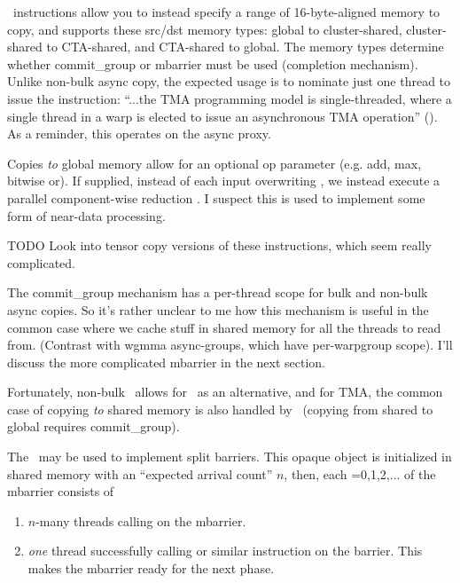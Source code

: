 \filbreak
{} \cpAsyncBulk\ instructions allow you to instead specify a range of 16-byte-aligned memory to copy, and supports these src/dst memory types: global to cluster-shared, cluster-shared to CTA-shared, and CTA-shared to global. The memory types determine whether commit\_group or mbarrier must be used (completion mechanism). Unlike non-bulk async copy, the expected usage is to nominate just one thread to issue the instruction: ``...the TMA programming model is single-threaded, where a single thread in a warp is elected to issue an asynchronous TMA operation'' (\hopperBlog). As a reminder, this operates on the async proxy.

\filbreak
Copies \textit{to} global memory allow for an optional  op parameter (e.g. add, max, bitwise or).
If supplied, instead of each input  overwriting , we instead execute a parallel component-wise reduction .
I suspect this is used to implement some form of near-data processing.

\filbreak
TODO Look into tensor copy versions of these instructions, which seem really complicated.


\filbreak
{} The commit\_group mechanism has a per-thread scope for bulk and non-bulk async copies. So it's rather unclear to me how this mechanism is useful in the common case where we cache stuff in shared memory for all the threads to read from. (Contrast with wgmma async-groups, which have per-warpgroup scope). I'll discuss the more complicated mbarrier in the next section.

Fortunately, non-bulk \cpAsync\ allows for \mbarrier\ as an alternative, and for TMA, the common case of copying \textit{to} shared memory is also handled by \mbarrier\ (copying from shared to global requires commit\_group).

\filbreak
{}

 The \mbarrier\ may be used to implement split barriers. This opaque object is initialized in shared memory with an ``expected arrival count'' $n$, then, each =0,1,2,... of the mbarrier consists of

\begin{enumerate}
  \item $n$-many threads calling  on the mbarrier.
  \item \textit{one} thread successfully calling  or similar instruction on the barrier. This makes the mbarrier ready for the next phase.
\end{enumerate}

